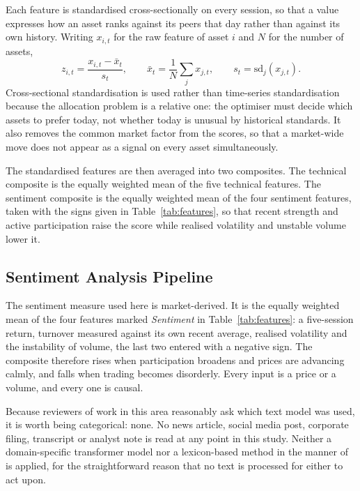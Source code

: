 Each feature is standardised cross-sectionally on every session, so that a value
expresses how an asset ranks against its peers that day rather than against its own
history. Writing $x_{i,t}$ for the raw feature of asset $i$ and $N$ for the number of
assets,
\begin{equation}
z_{i,t} = \frac{x_{i,t} - \bar{x}_t}{s_t}, \qquad
\bar{x}_t = \frac{1}{N}\sum_{j} x_{j,t}, \qquad
s_t = \mathrm{sd}_j(x_{j,t}).
\end{equation}
Cross-sectional standardisation is used rather than time-series standardisation because
the allocation problem is a relative one: the optimiser must decide which assets to
prefer today, not whether today is unusual by historical standards. It also removes the
common market factor from the scores, so that a market-wide move does not appear as a
signal on every asset simultaneously.

The standardised features are then averaged into two composites. The technical
composite is the equally weighted mean of the five technical features. The sentiment
composite is the equally weighted mean of the four sentiment features, taken with
the signs given in Table~\ref{tab:features}, so that recent strength and active participation raise the
score while realised volatility and unstable volume lower it.

\subsection{Sentiment Analysis Pipeline}
\label{sec:sentiment}

The sentiment measure used here is market-derived. It is the equally weighted mean of
the four features marked \emph{Sentiment} in Table~\ref{tab:features}: a five-session
return, turnover measured against its own recent average, realised volatility and the
instability of volume, the last two entered with a negative sign. The composite
therefore rises when participation broadens and prices are advancing calmly, and falls
when trading becomes disorderly. Every input is a price or a volume, and every one is
causal.

Because reviewers of work in this area reasonably ask which text model was used, it is
worth being categorical: none. No news article, social media post, corporate filing,
transcript or analyst note is read at any point in this study. Neither a domain-specific
transformer model nor a lexicon-based method in the manner of
\citet{loughran11} is applied, for the straightforward reason that no text is processed
for either to act upon.

